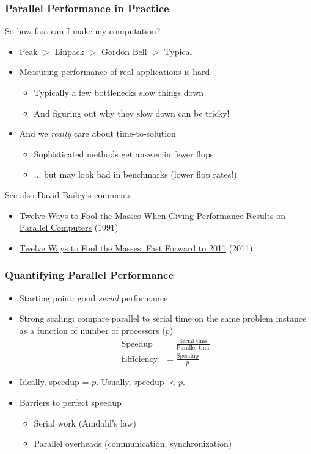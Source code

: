 \documentclass{beamer}
\begin{document}
\begin{frame}
  \frametitle{Parallel Performance in Practice}

  So how fast can I make my computation?
  \begin{itemize}
  \item Peak $ > $ Linpack $ > $ Gordon Bell $ > $ Typical
  \item Measuring performance of real applications is hard
    \begin{itemize}
    \item Typically a few bottlenecks slow things down
    \item And figuring out why they slow down can be tricky!
    \end{itemize}
  \item And we {\em really} care about time-to-solution
    \begin{itemize}
    \item Sophisticated methods get answer in fewer flops
    \item ... but may look bad in benchmarks (lower flop rates!)
    \end{itemize}
  \end{itemize}

  \vspace{1cm}
  See also David Bailey's comments:
  \begin{itemize}
  \item \href{http://crd.lbl.gov/~dhbailey/dhbpapers/twelve-ways.pdf}{\small Twelve Ways to Fool the Masses When Giving Performance Results on Parallel Computers} (1991)
  \item \href{http://crd.lbl.gov/~dhbailey/dhbtalks/dhb-12ways.pdf}{\small Twelve Ways to Fool the Masses: Fast Forward to 2011} (2011)
  \end{itemize}
\end{frame}

\begin{frame}
  \frametitle{Quantifying Parallel Performance}
  
  \begin{itemize}
  \item Starting point: good {\em serial} performance
  \item Strong scaling: compare parallel to serial time on the same
    problem instance as a function of number of processors ($p$)
    \begin{align*}
      \mbox{Speedup} &= \frac{\mbox{Serial time}}{\mbox{Parallel time}} \\[2mm]
      \mbox{Efficiency} &= \frac{\mbox{Speedup}}{p}
    \end{align*}
  \item
    Ideally, speedup = $p$.  
    Usually, speedup $ < p$.
  \item Barriers to perfect speedup
    \begin{itemize}
    \item Serial work (Amdahl's law)
    \item Parallel overheads (communication, synchronization)
    \end{itemize}
  \end{itemize}
\end{frame}
\end{document}
